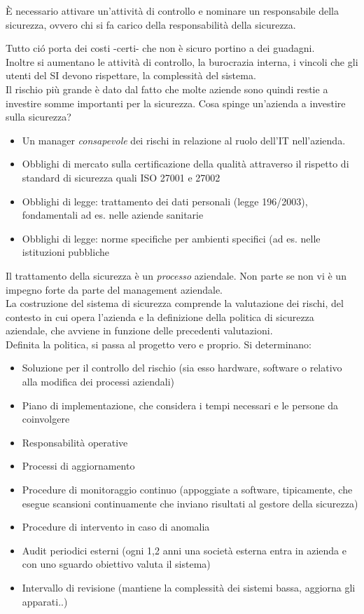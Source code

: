 \`E necessario attivare un'attivit\`a di controllo e nominare un responsabile della sicurezza, ovvero chi si fa carico della responsabilit\`a della sicurezza.

Tutto ci\'o porta dei costi -certi- che non \`e sicuro portino a dei guadagni.\\
Inoltre si aumentano le attivit\`a di controllo, la burocrazia interna, i vincoli che gli utenti del SI devono rispettare, la complessit\`a del sistema.\\
Il rischio pi\`u grande \`e dato dal fatto che molte aziende sono quindi restie a investire somme importanti per la sicurezza.
Cosa spinge un'azienda a investire sulla sicurezza?

\begin{itemize}

\item
  Un manager \emph{consapevole} dei rischi in relazione al ruolo dell'IT
  nell'azienda.
\item
  Obblighi di mercato sulla certificazione della qualit\`a attraverso il
  rispetto di standard di sicurezza quali ISO 27001 e 27002
\item
  Obblighi di legge: trattamento dei dati personali (legge 196/2003), fondamentali ad es. nelle aziende sanitarie
\item
  Obblighi di legge: norme specifiche per ambienti specifici (ad es. nelle istituzioni pubbliche
\end{itemize}
Il trattamento della sicurezza \`e un \emph{processo} aziendale. Non parte
se non vi \`e un impegno forte da parte del management aziendale.\\
La costruzione del sistema di sicurezza comprende la valutazione dei
rischi, del contesto in cui opera l'azienda e la definizione della
politica di sicurezza aziendale, che avviene in funzione delle
precedenti valutazioni.\\
Definita la politica, si passa al progetto vero e proprio. Si
determinano:

\begin{itemize}

\item
  Soluzione per il controllo del rischio (sia esso hardware, software o relativo alla modifica dei processi aziendali)
\item
  Piano di implementazione, che considera i tempi necessari e le persone da coinvolgere
\item
  Responsabilit\`a operative
\item
  Processi di aggiornamento
\item
  Procedure di monitoraggio continuo (appoggiate a software, tipicamente, che
  esegue scansioni continuamente che inviano risultati al gestore della
  sicurezza)
\item
  Procedure di intervento in caso di anomalia
\item
  Audit periodici esterni (ogni 1,2 anni una societ\`a esterna entra in azienda e con uno sguardo obiettivo valuta il sistema)
\item
  Intervallo di revisione (mantiene la complessit\`a dei sistemi bassa, aggiorna gli apparati..)
\end{itemize}

